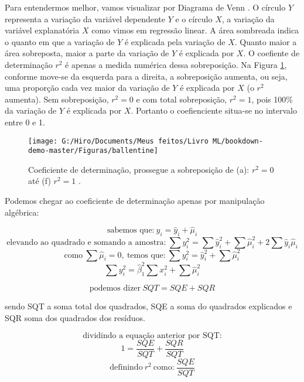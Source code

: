 \documentclass[
  openany]{book}
\begin{document}
Para entendermos melhor, vamos visualizar por Diagrama de Venn \citep{kennedy1981ballentine}. O círculo \(Y\) representa a variação da variável dependente \(Y\) e o círculo \(X\), a variação da variável explanatória \(X\) como vimos em regressão linear. A área sombreada indica o quanto em que a variação de \(Y\) é explicada pela variação de \(X\). Quanto maior a área sobreposta, maior a parte da variação de \(Y\) é explicada por \(X\). O coefiente de determinação \(r^2\) é apenas a medida numérica dessa sobreposição. Na Figura \ref{fig:ballentine}, conforme move-se da esquerda para a direita, a sobreposição aumenta, ou seja, uma proporção cada vez maior da variação de \(Y\)
é explicada por \(X\) (o \(r^2\) aumenta). Sem sobreposição, \(r^2=0\) e com total sobreposição, \(r^2=1\), pois 100\% da variação de \(Y\) é explicada por \(X\). Portanto o coefienciente situa-se no intervalo entre 0 e 1.

\begin{figure}

{\centering \texttt{[image: G:/Hiro/Documents/Meus feitos/Livro ML/bookdown-demo-master/Figuras/ballentine]} 

}

\caption{Coeficiente de determinação, prossegue a sobreposição de (a): \(r^2=0\) até (f) \(r^2=1\) \citep{gujarati2011econometria}.}\label{fig:ballentine}
\end{figure}



Podemos chegar ao coeficiente de determinação apenas por manipulação algébrica:

\[\mbox{sabemos que:} \ y_i=\hat{y}_i+\hat{\mu}_i\]
\[\mbox{elevando ao quadrado e somando a amostra:} \ \sum y^2_i=\sum \hat{y}^2_i+\sum \hat{\mu}^2_i+2\sum \hat{y}_i \hat{\mu}_i \]
\[\mbox{como} \ \sum \hat{\mu}_i=0, \ \mbox{temos que:}\ \sum y^2_i= \hat{y}^2_i+\sum \hat{\mu}^2_i \]
\[\sum y^2_i=\hat{\beta}^2_1 \sum x_i^2+\sum \hat{\mu}^2_i \]

\begin{equation}
    \mbox{podemos dizer} \ SQT=SQE+SQR
    \label{eq:sqt}
\end{equation}

sendo SQT a soma total dos quadrados, SQE a soma do quadrados explicados e SQR soma dos quadrados dos resíduos.

\[\mbox{dividindo a equação anterior por SQT:}\]
\[1=\frac{SQE}{SQT}+\frac{SQR}{SQT} \]
\[\mbox{definindo}\ r^2 \ \mbox{como:} \ \frac{SQE}{SQT} \]
\end{document}
